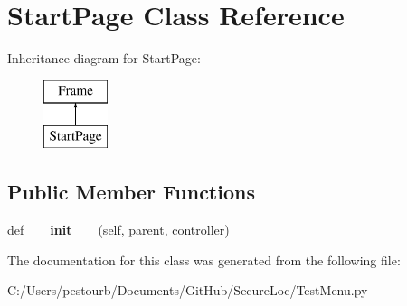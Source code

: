 \hypertarget{class_test_menu_1_1_start_page}{}\section{Start\+Page Class Reference}
\label{class_test_menu_1_1_start_page}
Inheritance diagram for Start\+Page\+:\begin{figure}[H]
\begin{center}
\leavevmode
\includegraphics[height=2.000000cm]{class_test_menu_1_1_start_page}
\end{center}
\end{figure}
\subsection*{Public Member Functions}
\begin{DoxyCompactItemize}
\item 
\mbox{\label{class_test_menu_1_1_start_page_a558d9afc290e8d1ff922f46114f16631}} 
def {\bfseries \+\_\+\+\_\+init\+\_\+\+\_\+} (self, parent, controller)
\end{DoxyCompactItemize}


The documentation for this class was generated from the following file\+:\begin{DoxyCompactItemize}
\item 
C\+:/\+Users/pestourb/\+Documents/\+Git\+Hub/\+Secure\+Loc/Test\+Menu.\+py\end{DoxyCompactItemize}
